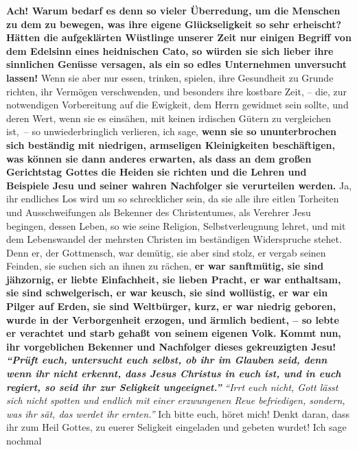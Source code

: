 \medskip

\label{ref:18_11_ueberredung}
\textbf{Ach! Warum bedarf es denn so vieler Überredung, um die Menschen zu dem
zu
bewegen, was ihre eigene Glückseligkeit so sehr erheischt? Hätten die
aufgeklärten Wüstlinge unserer Zeit nur einigen Begriff von dem Edelsinn eines
heidnischen Cato, so würden sie sich lieber ihre
sinnlichen Genüsse
versagen, als ein so edles Unternehmen unversucht lassen!} Wenn sie aber nur
essen, trinken, spielen, ihre Gesundheit zu Grunde richten, ihr Vermögen
verschwenden, und besonders ihre kostbare Zeit, -- die, zur notwendigen
Vorbereitung auf die Ewigkeit, dem Herrn gewidmet sein sollte, und deren Wert,
wenn sie es einsähen, mit keinen irdischen Gütern zu vergleichen ist,~-- so
unwiederbringlich verlieren, ich sage, \textbf{wenn sie so ununterbrochen sich
beständig mit niedrigen, armseligen Kleinigkeiten beschäftigen, was können sie
dann anderes erwarten, als dass an dem großen Gerichtstag Gottes die
Heiden sie
richten und die Lehren und Beispiele Jesu und seiner wahren Nachfolger sie
verurteilen werden.} Ja, ihr endliches Los wird um so schrecklicher sein, da
sie alle ihre eitlen Torheiten und Ausschweifungen als Bekenner des
Christentumes, als Verehrer Jesu begingen, dessen Leben, so wie seine
Religion, Selbstverleugnung lehret, und mit dem Lebenswandel der mehrsten
Christen im beständigen Widerspruche stehet. Denn er, der
Gottmensch, war
demütig, sie aber sind stolz, er vergab seinen Feinden, sie suchen sich an
ihnen zu rächen, \textbf{er war sanftmütig, sie sind jähzornig, er liebte
Einfachheit,
sie lieben Pracht, er war enthaltsam, sie sind schwelgerisch, er war keusch, sie
sind wollüstig, er war ein Pilger auf Erden, sie sind Weltbürger, kurz, er war
niedrig geboren, wurde in der Verborgenheit erzogen, und ärmlich bedient, -- so
lebte er verachtet und starb gehaßt von seinem eigenen Volk. Kommt nun, ihr
vorgeblichen Bekenner und Nachfolger dieses gekreuzigten Jesu!
\textit{"`Prüft euch,
untersucht euch selbst, ob ihr im Glauben seid, denn wenn ihr nicht erkennt,
dass Jesus Christus in euch ist, und in euch regiert, so seid ihr zur
Seligkeit ungeeignet."'}}
\textit{"`Irrt euch
nicht, Gott lässt sich nicht spotten und endlich mit einer erzwungenen Reue
befriedigen, sondern, was ihr sät, das werdet ihr ernten."'}
Ich bitte euch, höret mich! Denkt daran, dass ihr zum Heil Gottes, zu
euerer Seligkeit eingeladen und gebeten wurdet! Ich sage nochmal
